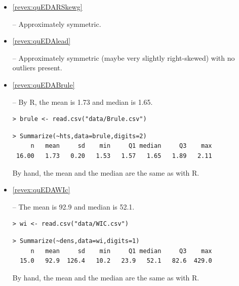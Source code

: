\documentclass[10pt,openany]{book}\usepackage[]{graphicx}\usepackage[]{color}
\makeatletter
\newenvironment{kframe}{%
 \def\at@end@of@kframe{}%
 \ifinner\ifhmode%
  \def\at@end@of@kframe{\end{minipage}}%
  \begin{minipage}{\columnwidth}%
 \fi\fi%
 \def\FrameCommand##1{\hskip\@totalleftmargin \hskip-\fboxsep
 \colorbox{shadecolor}{##1}\hskip-\fboxsep
     \hskip-\linewidth \hskip-\@totalleftmargin \hskip\columnwidth}%
 \MakeFramed {\advance\hsize-\width
   \@totalleftmargin\z@ \linewidth\hsize
   \@setminipage}}%
 {\par\unskip\endMakeFramed%
 \at@end@of@kframe}
\newenvironment{knitrout}{}{} %
\makeatother
\begin{document}
\begin{itemize}
  \item \hypertarget{ans:quEDARSkewg}{\ref{revex:quEDARSkewg}} --  Approximately symmetric.

  \item \hypertarget{ans:quEDAlead}{\ref{revex:quEDAlead}} --  Approximately symmetric (maybe very slightly right-skewed) with no outliers present.



  \item \hypertarget{ans:quEDABrule}{\ref{revex:quEDABrule}} -- By R, the mean is 1.73 and median is 1.65.
\begin{knitrout}
\color{fgcolor}\begin{kframe}
\begin{verbatim}
> brule <- read.csv("data/Brule.csv")
\end{verbatim}
\end{kframe}
\end{knitrout}
\begin{knitrout}
\color{fgcolor}\begin{kframe}
\begin{verbatim}
> Summarize(~hts,data=brule,digits=2)
     n   mean     sd    min     Q1 median     Q3    max 
 16.00   1.73   0.20   1.53   1.57   1.65   1.89   2.11 
\end{verbatim}
\end{kframe}
\end{knitrout}
\noindent By hand, the mean and the median are the same as with R.



  \item \hypertarget{ans:quEDAWIC}{\ref{revex:quEDAWIc}} -- The mean is 92.9 and median is 52.1.
\begin{knitrout}
\color{fgcolor}\begin{kframe}
\begin{verbatim}
> wi <- read.csv("data/WIC.csv")
\end{verbatim}
\end{kframe}
\end{knitrout}
\begin{knitrout}
\color{fgcolor}\begin{kframe}
\begin{verbatim}
> Summarize(~dens,data=wi,digits=1)
     n   mean     sd    min     Q1 median     Q3    max 
  15.0   92.9  126.4   10.2   23.9   52.1   82.6  429.0 
\end{verbatim}
\end{kframe}
\end{knitrout}
\noindent By hand, the mean and the median are the same as with R.



\end{itemize}
\end{document}

